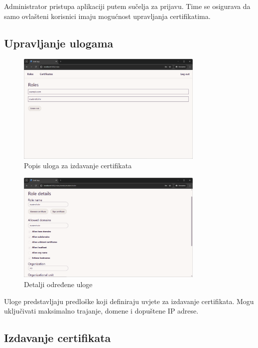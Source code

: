 \documentclass[]{foi}
\begin{document}
Administrator pristupa aplikaciji putem sučelja za prijavu. Time se osigurava da samo ovlašteni korisnici imaju mogućnost upravljanja certifikatima.

\subsection{Upravljanje ulogama}

\begin{figure}[H]
    \centering
    \includegraphics[width=0.8\textwidth]{assets/roles.png}
    \caption{Popis uloga za izdavanje certifikata}
\end{figure}

\begin{figure}[H]
    \centering
    \includegraphics[width=0.8\textwidth]{assets/role-details.png}
    \caption{Detalji određene uloge}
\end{figure}

Uloge predstavljaju predloške koji definiraju uvjete za izdavanje certifikata. Mogu uključivati maksimalno trajanje, domene i dopuštene IP adrese.

\subsection{Izdavanje certifikata}
\end{document}
